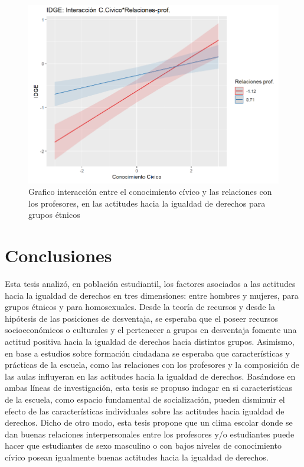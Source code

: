 \documentclass[12pt,twoside]{templates/facsothesis}
\begin{document}
\begin{figure}[H]

{\centering \includegraphics[width=0.9\linewidth]{input/images/PLOTINT4} 

}

\caption{Grafico interacción entre el conocimiento cívico y las relaciones con los profesores, en las actitudes hacia la igualdad de derechos para grupos étnicos}\label{fig:unnamed-chunk-17}
\end{figure}

\hypertarget{conclusiones}{%
\chapter{Conclusiones}\label{conclusiones}}

Esta tesis analizó, en población estudiantil, los factores asociados a las actitudes hacia la igualdad de derechos en tres dimensiones: entre hombres y mujeres, para grupos étnicos y para homosexuales. Desde la teoría de recursos y desde la hipótesis de las posiciones de desventaja, se esperaba que el poseer recursos socioeconómicos o culturales y el pertenecer a grupos en desventaja fomente una actitud positiva hacia la igualdad de derechos hacia distintos grupos. Asimismo, en base a estudios sobre formación ciudadana se esperaba que características y prácticas de la escuela, como las relaciones con los profesores y la composición de las aulas influyeran en las actitudes hacia la igualdad de derechos. Basándose en ambas líneas de investigación, esta tesis se propuso indagar en si características de la escuela, como espacio fundamental de socialización, pueden disminuir el efecto de las características individuales sobre las actitudes hacia igualdad de derechos. Dicho de otro modo, esta tesis propone que un clima escolar donde se dan buenas relaciones interpersonales entre los profesores y/o estudiantes puede hacer que estudiantes de sexo masculino o con bajos niveles de conocimiento cívico posean igualmente buenas actitudes hacia la igualdad de derechos.
\end{document}

